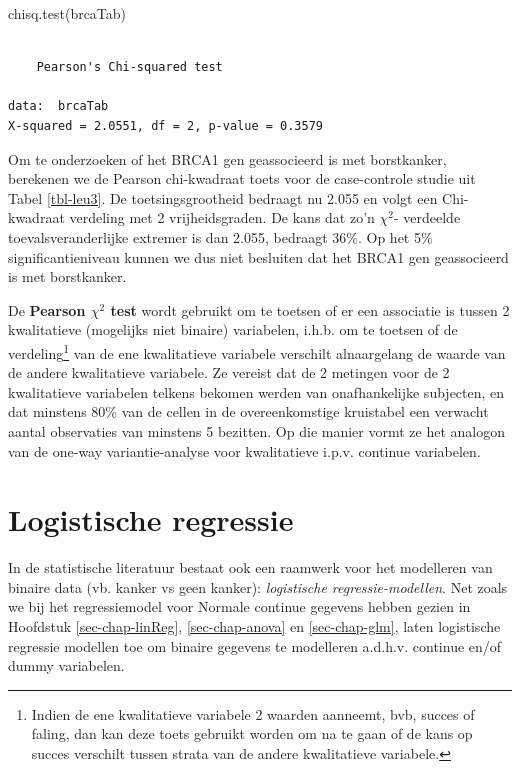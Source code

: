 \documentclass[
  dutch,
  letterpaper,
  12pt]{book}
\newenvironment{Shaded}{\begin{snugshade}}{\end{snugshade}}
\newcommand{\FunctionTok}[1]{\textcolor[rgb]{0.28,0.35,0.67}{#1}}
\newcommand{\NormalTok}[1]{\textcolor[rgb]{0.00,0.23,0.31}{#1}}
\theoremstyle{definition}
\theoremstyle{definition}
\theoremstyle{definition}
\theoremstyle{remark}
\begin{document}
\begin{Shaded}
\begin{Highlighting}[]
\FunctionTok{chisq.test}\NormalTok{(brcaTab)}
\end{Highlighting}
\end{Shaded}

\begin{verbatim}

    Pearson's Chi-squared test

data:  brcaTab
X-squared = 2.0551, df = 2, p-value = 0.3579
\end{verbatim}

Om te onderzoeken of het BRCA1 gen geassocieerd is met borstkanker,
berekenen we de Pearson chi-kwadraat toets voor de case-controle studie
uit Tabel \ref{tbl-leu3}. De toetsingsgrootheid bedraagt nu 2.055 en
volgt een Chi-kwadraat verdeling met 2 vrijheidsgraden. De kans dat zo'n
\(\chi^2\)- verdeelde toevalsveranderlijke extremer is dan 2.055,
bedraagt 36\%. Op het 5\% significantieniveau kunnen we dus niet
besluiten dat het BRCA1 gen geassocieerd is met borstkanker.

De \textbf{Pearson \(\chi^2\) test} wordt gebruikt om te toetsen of er
een associatie is tussen 2 kwalitatieve (mogelijks niet binaire)
variabelen, i.h.b. om te toetsen of de verdeling\footnote{Indien de ene
  kwalitatieve variabele 2 waarden aanneemt, bvb, succes of faling, dan
  kan deze toets gebruikt worden om na te gaan of de kans op succes
  verschilt tussen strata van de andere kwalitatieve variabele.} van de
ene kwalitatieve variabele verschilt alnaargelang de waarde van de
andere kwalitatieve variabele. Ze vereist dat de 2 metingen voor de 2
kwalitatieve variabelen telkens bekomen werden van onafhankelijke
subjecten, en dat minstens 80\% van de cellen in de overeenkomstige
kruistabel een verwacht aantal observaties van minstens 5 bezitten. Op
die manier vormt ze het analogon van de one-way variantie-analyse voor
kwalitatieve i.p.v. continue variabelen.

\section{Logistische regressie}\label{logistische-regressie}

In de statistische literatuur bestaat ook een raamwerk voor het
modelleren van binaire data (vb. kanker vs geen kanker):
\emph{logistische regressie-modellen}. Net zoals we bij het
regressiemodel voor Normale continue gegevens hebben gezien in Hoofdstuk
\ref{sec-chap-linReg}, \ref{sec-chap-anova} en \ref{sec-chap-glm}, laten
logistische regressie modellen toe om binaire gegevens te modelleren
a.d.h.v. continue en/of dummy variabelen.
\end{document}
